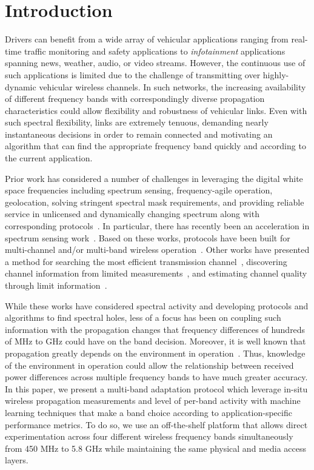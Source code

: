 
\section{Introduction}
\label{sec:introduction}


Drivers can benefit from a wide array of vehicular applications ranging from real-time traffic monitoring and
safety applications to {\it infotainment} applications spanning news, weather, audio, or video streams.  
However, the continuous use of such applications is limited due to the challenge of transmitting over 
highly-dynamic vehicular wireless channels. In such networks, the increasing availability of different 
frequency bands with correspondingly diverse propagation characteristics could allow flexibility and 
robustness of vehicular links. Even with such spectral flexibility, links are extremely tenuous, 
demanding nearly instantaneous decisions in order to remain connected and motivating an algorithm that
can find the appropriate frequency band quickly and according to the current application.

Prior work has considered a number of challenges in
leveraging the digital white space frequencies including spectrum sensing, frequency-agile operation,
geolocation, solving stringent spectral mask requirements, and providing reliable service
in unlicensed and dynamically changing spectrum along with corresponding 
protocols~\cite{shellhammer2009technical}. In particular, there has recently been an acceleration
in spectrum sensing work~\cite{rayanchu2011fluid, kim1996pulse,cabric2004implementation}. Based on 
these works, protocols have been built for multi-channel and/or multi-band wireless operation~\cite{MOAR,
raychaudhuri2003spectrum,sabharwal2007opportunistic}.  Other works have presented a method for searching the most efficient 
transmission channel~\cite{mo2005comparison}, discovering channel information from limited 
measurements~\cite{rayanchu2011fluid, sabharwal2007opportunistic}, and estimating 
channel quality through limit information~\cite{MOAR}. 

While these works have considered spectral activity and developing protocols and algorithms to 
find spectral holes, less of a focus has been on coupling such information with the propagation 
changes that frequency differences of hundreds of MHz to GHz could have on the band decision.  
Moreover, it is well known that propagation greatly depends on the environment in 
operation~\cite{rappaport}.  Thus, 
knowledge of the environment in operation could allow the relationship between received power 
differences across multiple frequency bands to have much greater accuracy.  In this paper, 
we present a multi-band adaptation protocol which leverage in-situ wireless propagation 
measurements and level of per-band activity with machine learning techniques that make a 
band choice according to application-specific performance metrics. To do so, we use an
off-the-shelf platform that allows direct experimentation across four different wireless
frequency bands simultaneously from 450 MHz to 5.8 GHz while maintaining the same physical
and media access layers.

